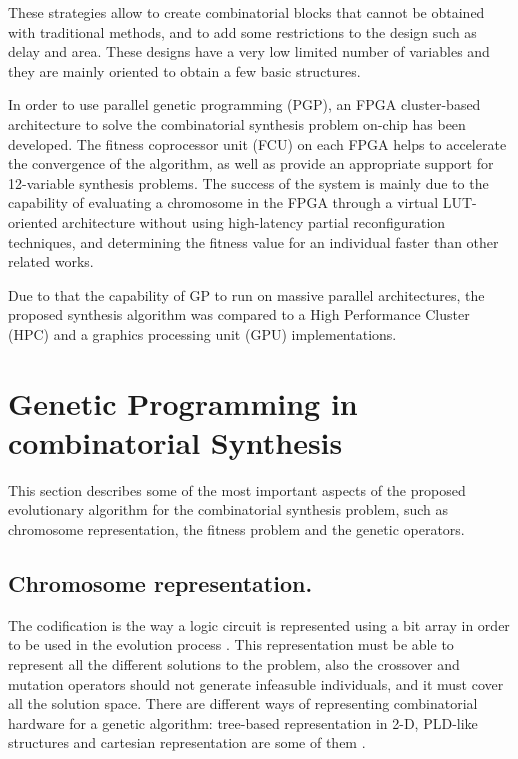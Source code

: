 \documentclass{sig-alternate}
\begin{document}
These strategies allow to create combinatorial blocks that cannot be obtained with traditional methods, and to add some restrictions to the design such as delay and area. These designs have a very low limited number of variables \cite{DGJH98} and they are mainly oriented to obtain a few basic structures.

In order to use parallel genetic programming (PGP), an FPGA cluster-based architecture to solve the combinatorial synthesis problem on-chip has been developed. The fitness coprocessor unit (FCU) on each FPGA helps to accelerate the convergence of the algorithm, as well as provide an appropriate support for 12-variable synthesis problems. The success of the system is mainly due to the capability of evaluating a chromosome in the FPGA through a virtual LUT-oriented architecture without using high-latency partial reconfiguration techniques, and determining the fitness value for an individual faster than other related works. 

Due to that the capability of GP to run on massive parallel architectures, the proposed synthesis algorithm was compared to a High Performance Cluster (HPC) and a graphics processing unit (GPU) implementations. 

\section{Genetic Programming in combinatorial Synthesis}
This section describes some of the most important aspects of the proposed evolutionary algorithm for the combinatorial synthesis problem, such as chromosome representation, the fitness problem and the genetic operators.

\subsection{Chromosome representation.}
The codification is the way a logic circuit is represented using a bit array in order to be used in the evolution process \cite{FR06}. This representation must be able to represent all the different solutions to the problem, also the crossover and mutation operators should not generate infeasuble individuals, and it must cover all the solution space. There are different ways of representing combinatorial hardware for a genetic algorithm: tree-based representation in 2-D, PLD-like structures and cartesian representation are some of them \cite{JKFB+99} \cite{THTN+92} \cite{JMPT98}.
\end{document}
